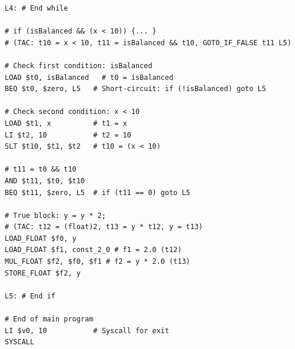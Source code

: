 \documentclass[11pt, letterpaper]{article}
\begin{document}
\begin{lstlisting}[style=Assembly]
L4: # End while

# if (isBalanced && (x < 10)) {... }
# (TAC: t10 = x < 10, t11 = isBalanced && t10, GOTO_IF_FALSE t11 L5)

# Check first condition: isBalanced
LOAD $t0, isBalanced   # t0 = isBalanced
BEQ $t0, $zero, L5   # Short-circuit: if (!isBalanced) goto L5

# Check second condition: x < 10
LOAD $t1, x          # t1 = x
LI $t2, 10           # t2 = 10
SLT $t10, $t1, $t2   # t10 = (x < 10)

# t11 = t0 && t10
AND $t11, $t0, $t10
BEQ $t11, $zero, L5  # if (t11 == 0) goto L5

# True block: y = y * 2;
# (TAC: t12 = (float)2, t13 = y * t12, y = t13)
LOAD_FLOAT $f0, y
LOAD_FLOAT $f1, const_2_0 # f1 = 2.0 (t12)
MUL_FLOAT $f2, $f0, $f1 # f2 = y * 2.0 (t13)
STORE_FLOAT $f2, y

L5: # End if

# End of main program
LI $v0, 10           # Syscall for exit
SYSCALL
\end{lstlisting}
\end{document}
